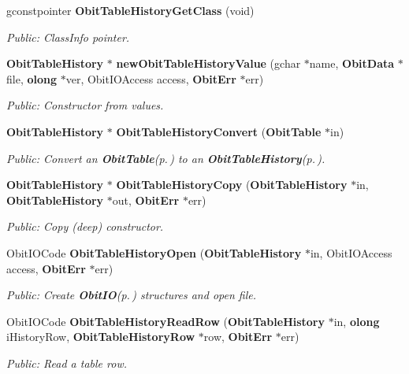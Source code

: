 \begin{CompactItemize}
gconstpointer {\bf Obit\-Table\-History\-Get\-Class} (void)
\begin{CompactList}\small\item\em Public: Class\-Info pointer. \item\end{CompactList}\item 
{\bf Obit\-Table\-History} $\ast$ {\bf new\-Obit\-Table\-History\-Value} (gchar $\ast$name, {\bf Obit\-Data} $\ast$file, {\bf olong} $\ast$ver, Obit\-IOAccess access, {\bf Obit\-Err} $\ast$err)
\begin{CompactList}\small\item\em Public: Constructor from values. \item\end{CompactList}\item 
{\bf Obit\-Table\-History} $\ast$ {\bf Obit\-Table\-History\-Convert} ({\bf Obit\-Table} $\ast$in)
\begin{CompactList}\small\item\em Public: Convert an {\bf Obit\-Table}{\rm (p.\,\pageref{structObitTable})} to an {\bf Obit\-Table\-History}{\rm (p.\,\pageref{structObitTableHistory})}. \item\end{CompactList}\item 
{\bf Obit\-Table\-History} $\ast$ {\bf Obit\-Table\-History\-Copy} ({\bf Obit\-Table\-History} $\ast$in, {\bf Obit\-Table\-History} $\ast$out, {\bf Obit\-Err} $\ast$err)
\begin{CompactList}\small\item\em Public: Copy (deep) constructor. \item\end{CompactList}\item 
Obit\-IOCode {\bf Obit\-Table\-History\-Open} ({\bf Obit\-Table\-History} $\ast$in, Obit\-IOAccess access, {\bf Obit\-Err} $\ast$err)
\begin{CompactList}\small\item\em Public: Create {\bf Obit\-IO}{\rm (p.\,\pageref{structObitIO})} structures and open file. \item\end{CompactList}\item 
Obit\-IOCode {\bf Obit\-Table\-History\-Read\-Row} ({\bf Obit\-Table\-History} $\ast$in, {\bf olong} i\-History\-Row, {\bf Obit\-Table\-History\-Row} $\ast$row, {\bf Obit\-Err} $\ast$err)
\begin{CompactList}\small\item\em Public: Read a table row. \item\end{CompactList}\item 

\end{CompactItemize}
